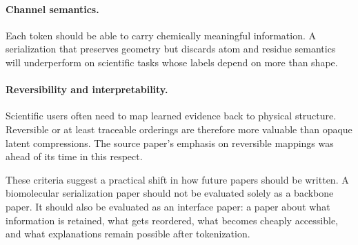 \paragraph{Channel semantics.}
Each token should be able to carry chemically meaningful information. A serialization that preserves geometry but discards atom and residue semantics will underperform on scientific tasks whose labels depend on more than shape.

\paragraph{Reversibility and interpretability.}
Scientific users often need to map learned evidence back to physical structure. Reversible or at least traceable orderings are therefore more valuable than opaque latent compressions. The source paper's emphasis on reversible mappings was ahead of its time in this respect.

These criteria suggest a practical shift in how future papers should be written. A biomolecular serialization paper should not be evaluated solely as a backbone paper. It should also be evaluated as an interface paper: a paper about what information is retained, what gets reordered, what becomes cheaply accessible, and what explanations remain possible after tokenization.

